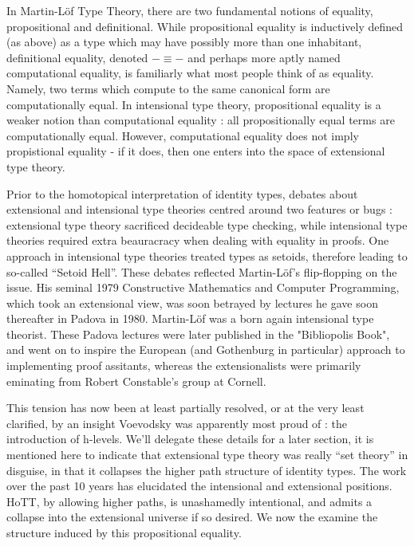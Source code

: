 In Martin-Löf Type Theory, there are two fundamental notions of equality,
propositional and definitional.  While propositional equality is inductively
defined (as above) as a type which may have possibly more than one inhabitant,
definitional equality, denoted $-\equiv -$ and perhaps more aptly named
computational equality, is familiarly what most people think of as equality.
Namely, two terms which compute to the same canonical form are computationally
equal. In intensional type theory, propositional equality is a weaker notion
than computational equality : all propositionally equal terms are
computationally equal. However, computational equality does not imply
propistional equality - if it does, then one enters into the space of
extensional type theory. 

Prior to the homotopical interpretation of identity types, debates about
extensional and intensional type theories centred around two features or bugs :
extensional type theory sacrificed decideable type checking, while intensional
type theories required extra beauracracy when dealing with equality in proofs.
One approach in intensional type theories treated types as setoids, therefore
leading to so-called ``Setoid Hell''. These debates reflected Martin-Löf's
flip-flopping on the issue. His seminal 1979 Constructive Mathematics and
Computer Programming, which took an extensional view, was soon betrayed by
lectures he gave soon thereafter in Padova in 1980.  Martin-Löf was a born
again intensional type theorist.  These Padova lectures were later published in
the "Bibliopolis Book", and went on to inspire the European (and Gothenburg in
particular) approach to implementing proof assitants, whereas the
extensionalists were primarily eminating from Robert Constable's group at
Cornell. 

This tension has now been at least partially resolved, or at the very least
clarified, by an insight Voevodsky was apparently most proud of : the
introduction of h-levels. We'll delegate these details for a later section, it
is mentioned here to indicate that extensional type theory was really ``set
theory'' in disguise, in that it collapses the higher path structure of
identity types. The work over the past 10 years has elucidated the intensional
and extensional positions. HoTT, by allowing higher paths, is unashamedly
intentional, and admits a collapse into the extensional universe if so desired.
We now the examine the structure induced by this propositional equality.
